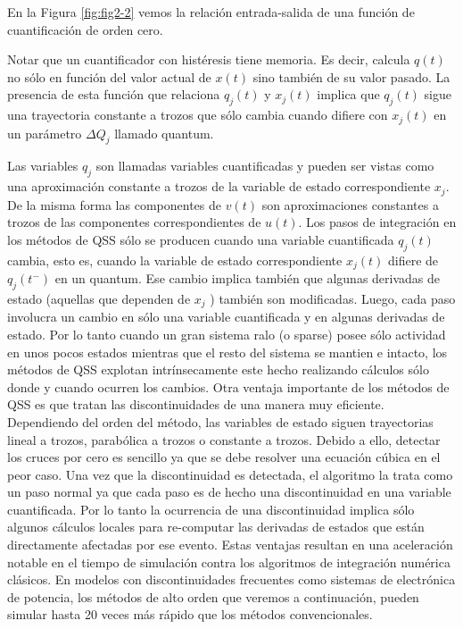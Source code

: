 \documentclass[a4paper,	11pt]{report}
\begin{document}
En la Figura \ref{fig:fig2-2} vemos la relación entrada-salida de una función de cuantificación de orden cero.

Notar que un cuantificador con histéresis tiene memoria. Es decir, calcula $q(t)$ no sólo en función del valor actual de $x(t)$ sino también de su valor pasado.
La presencia de esta función que relaciona $q_j (t)$ y $x_j (t)$ implica que $q_j (t)$ sigue una trayectoria constante a trozos que sólo cambia cuando difiere con $x_j (t)$ en un parámetro $\Delta Q_j$ llamado quantum.

Las variables $q_j$ son llamadas variables cuantificadas y pueden ser vistas como una aproximación constante a trozos de la variable de estado correspondiente $x_j$. De la misma forma las componentes de $v(t)$ son aproximaciones constantes a trozos de las componentes correspondientes de $u(t)$. Los pasos de integración en los métodos de QSS sólo se producen cuando una variable cuantificada $q_j (t)$ cambia, esto es, cuando la variable de estado correspondiente $x_j (t)$ difiere de $q_j(t^{-})$ en un quantum. Ese cambio implica también que algunas derivadas de estado (aquellas que dependen de $x_j$ ) también son modificadas. Luego, cada paso involucra un cambio en sólo una variable cuantificada y en algunas derivadas de estado. Por lo tanto cuando un gran sistema ralo (o sparse) posee sólo actividad en unos pocos estados mientras que el resto del sistema se mantien	e intacto, los métodos de QSS explotan intrínsecamente este hecho realizando cálculos sólo donde y cuando ocurren los cambios.
Otra ventaja importante de los métodos de QSS es que tratan las discontinuidades de una manera muy eficiente. Dependiendo del orden del método, las variables de estado siguen trayectorias lineal a trozos, parabólica a trozos o constante a trozos. Debido a ello, detectar los cruces por cero es sencillo ya que se debe resolver una ecuación cúbica en el peor caso. Una vez que la discontinuidad es detectada, el algoritmo la trata como un paso normal ya que cada paso es de hecho una discontinuidad en una variable cuantificada. Por lo tanto la ocurrencia de una discontinuidad implica sólo algunos cálculos locales para re-computar las derivadas de estados que están directamente afectadas por ese evento.
Estas ventajas resultan en una aceleración notable en el tiempo de simulación contra los algoritmos de integración numérica clásicos. En modelos con discontinuidades frecuentes como sistemas de electrónica de potencia, los métodos de alto orden que veremos a continuación, pueden simular hasta 20 veces más rápido que los métodos convencionales.
\end{document}
